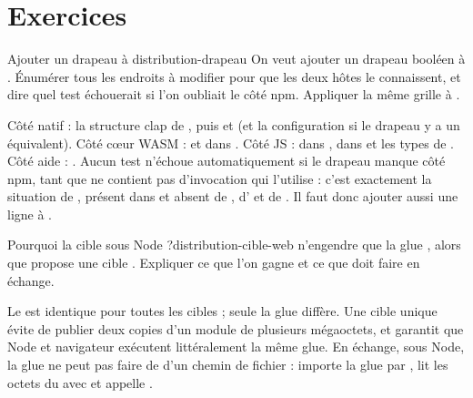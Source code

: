 \section{Exercices}
\label{sec:distribution-exercices}

\begin{exercice}{Ajouter un drapeau à }{distribution-drapeau}
On veut ajouter un drapeau booléen  à . Énumérer tous les endroits à modifier pour que les deux hôtes le connaissent, et dire quel test échouerait si l'on oubliait le côté npm. Appliquer la même grille à .
\end{exercice}
\begin{solution}
Côté natif : la structure clap de , puis  et  (et la configuration si le drapeau y a un équivalent). Côté cœur WASM :  et  dans . Côté JS :  dans ,  dans  et les types de . Côté aide : . Aucun test n'échoue automatiquement si le drapeau manque côté npm, tant que  ne contient pas d'invocation qui l'utilise : c'est exactement la situation de , présent dans  et absent de , d' et de . Il faut donc ajouter aussi une ligne  à .
\end{solution}

\begin{exercice}{Pourquoi la cible  sous Node ?}{distribution-cible-web}
 n'engendre que la glue , alors que  propose une cible . Expliquer ce que l'on gagne et ce que  doit faire en échange.
\end{exercice}
\begin{solution}
Le  est identique pour toutes les cibles ; seule la glue diffère. Une cible unique évite de publier deux copies d'un module de plusieurs mégaoctets, et garantit que Node et navigateur exécutent littéralement la même glue. En échange, sous Node, la glue ne peut pas faire de  d'un chemin de fichier :  importe la glue par , lit les octets du  avec  et appelle .
\end{solution}

